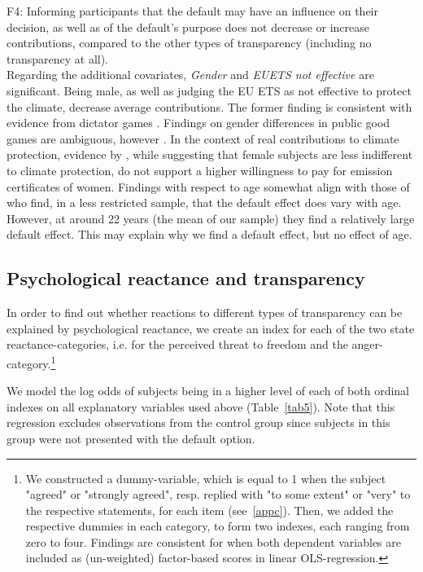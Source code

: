\documentclass[review, authoryear,12pt]{elsarticle}
\begin{document}
F4: Informing participants that the default may have an influence on their decision, as well as of the default's purpose does not decrease or increase contributions, compared to the other types of transparency (including no transparency at all).\\

Regarding the additional covariates, \textit{Gender} and \textit{EUETS not effective} are significant. Being male, as well as judging the EU ETS as not effective to protect the climate, decrease average contributions. The former finding is consistent with evidence from dictator games \citep{Engel.2011}. Findings on gender differences in public good games are ambiguous, however \citep{Croson.2009}. In the context of real contributions to climate protection, evidence by \cite{Diederich.2014}, while suggesting that female subjects are less indifferent to climate protection, do not support a higher willingness to pay for emission certificates of women. Findings with respect to age somewhat align with those of \cite{Borghans.2015} who find, in a less restricted sample, that the default effect does vary with age. However, at around 22 years (the mean of our sample) they find a relatively large default effect. This may explain why we find a default effect, but no effect of age.

\subsection{Psychological reactance and transparency}
In order to find out whether reactions to different types of transparency can be explained by psychological reactance, we create an index for each of the two state reactance-categories, i.e. for the perceived threat to freedom and the anger-category.\footnote{We constructed a dummy-variable, which is equal to 1 when the subject "agreed" or "strongly agreed", resp. replied with "to some extent" or "very" to the respective statements, for each item (see~\ref{appc}). Then, we added the respective dummies in each category, to form two indexes, each ranging from zero to four. Findings are consistent for when both dependent variables are included as (un-weighted) factor-based scores in linear OLS-regression.}

We model the log odds of subjects being in a higher level of each of both ordinal indexes on all explanatory variables used above (Table~\ref{tab5}). Note that this regression excludes observations from the control group since subjects in this group were not presented with the default option.
\end{document}
